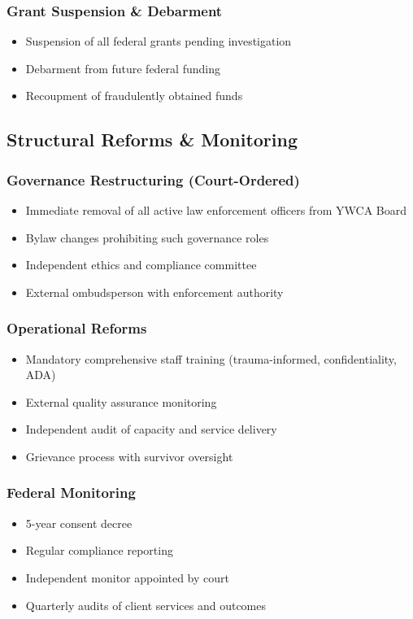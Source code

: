 \documentclass[11pt,letterpaper]{article}
\begin{document}
\subsubsection{Grant Suspension \& Debarment}
\begin{itemize}[leftmargin=*]
\item Suspension of all federal grants pending investigation
\item Debarment from future federal funding
\item Recoupment of fraudulently obtained funds
\end{itemize}

\subsection{Structural Reforms \& Monitoring}

\subsubsection{Governance Restructuring (Court-Ordered)}
\begin{itemize}[leftmargin=*]
\item Immediate removal of all active law enforcement officers from YWCA Board
\item Bylaw changes prohibiting such governance roles
\item Independent ethics and compliance committee
\item External ombudsperson with enforcement authority
\end{itemize}

\subsubsection{Operational Reforms}
\begin{itemize}[leftmargin=*]
\item Mandatory comprehensive staff training (trauma-informed, confidentiality, ADA)
\item External quality assurance monitoring
\item Independent audit of capacity and service delivery
\item Grievance process with survivor oversight
\end{itemize}

\subsubsection{Federal Monitoring}
\begin{itemize}[leftmargin=*]
\item 5-year consent decree
\item Regular compliance reporting
\item Independent monitor appointed by court
\item Quarterly audits of client services and outcomes
\end{itemize}
\end{document}
